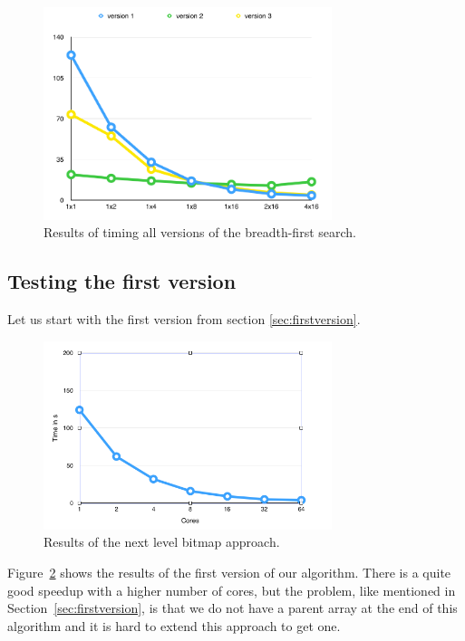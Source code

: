 \documentclass[12pt,a4paper]{article}
\begin{document}
\begin{figure}[!ht]
   \centering
   \includegraphics[width=0.75\textwidth]{allversions}
   \caption{Results of timing all versions of the breadth-first search.}
   \label{fig:allversions}
\end{figure}


\subsection{Testing the first version}
\label{sec:testingall}

Let us start with the first version from section \ref{sec:firstversion}.

\begin{figure}[!ht]
   \centering
   \includegraphics[width=0.75\textwidth]{next_level}
   \caption{Results of the next level bitmap approach.}
   \label{fig:nextbitmap}
\end{figure}

Figure~\ref{fig:nextbitmap} shows the results of the first version of our algorithm. There is a quite good speedup with a higher number of cores, but the problem, like mentioned in Section~\ref{sec:firstversion}, is that we do not have a parent array at the end of this algorithm and it is hard to extend this approach to get one.
\end{document}
